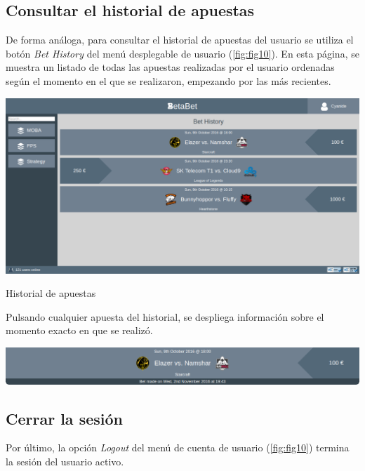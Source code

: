 \documentclass{article}
\begin{document}
\subsection{Consultar el historial de apuestas}
De forma análoga, para consultar el historial de apuestas del usuario se utiliza el botón \textit{Bet History} del menú desplegable de usuario (\autoref{fig:fig10}). En esta página, se muestra un listado de todas las apuestas realizadas por el usuario ordenadas según el momento en el que se realizaron, empezando por las más recientes.
\smallbreak
\begin{minipage}{\linewidth}
    \centering
    \captionsetup{type=figure}
    \includegraphics[width=\linewidth]{fig12}
    \caption{Historial de apuestas}
    \label{fig:fig12}
\end{minipage}
\medbreak
Pulsando cualquier apuesta del historial, se despliega información sobre el momento exacto en que se realizó.
\vspace{-16pt}
\begin{center}
    \includegraphics[width=.8\linewidth]{history1}
\end{center}
\subsection{Cerrar la sesión}
Por último, la opción \textit{Logout} del menú de cuenta de usuario (\autoref{fig:fig10}) termina la sesión del usuario activo.
\newpage
\end{document}
